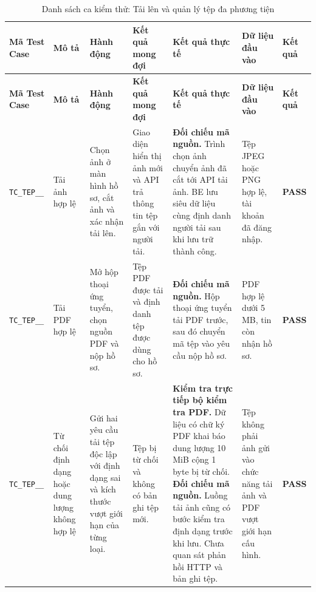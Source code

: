 \begin{landscape}
{
\fontsize{9.5}{11.5}\selectfont
\setlength{\tabcolsep}{3pt}
\renewcommand{\arraystretch}{1.2}
\begin{longtable}{|>{\raggedright\arraybackslash}p{2.1cm}|>{\raggedright\arraybackslash}p{2.8cm}|>{\raggedright\arraybackslash}p{3.8cm}|>{\raggedright\arraybackslash}p{4.0cm}|>{\raggedright\arraybackslash}p{5.0cm}|>{\raggedright\arraybackslash}p{3.2cm}|>{\centering\arraybackslash}p{1.3cm}|}
    \caption{Danh sách ca kiểm thử: Tải lên và quản lý tệp đa phương tiện} \label{tab:ts-tep-01} \\
    \hline
    \textbf{Mã Test Case} & \textbf{Mô tả} & \textbf{Hành động} & \textbf{Kết quả mong đợi} & \textbf{Kết quả thực tế} & \textbf{Dữ liệu đầu vào} & \textbf{Kết quả} \\
    \hline
    \endfirsthead
    \hline
    \textbf{Mã Test Case} & \textbf{Mô tả} & \textbf{Hành động} & \textbf{Kết quả mong đợi} & \textbf{Kết quả thực tế} & \textbf{Dữ liệu đầu vào} & \textbf{Kết quả} \\
    \hline
    \endhead
    \hline
    \endfoot
    \hline
    \endlastfoot
    \texttt{TC\_\allowbreak TEP\_\allowbreak 01\_\allowbreak 01} & Tải ảnh hợp lệ & Chọn ảnh ở màn hình hồ sơ, cắt ảnh và xác nhận tải lên. & Giao diện hiển thị ảnh mới và API trả thông tin tệp gắn với người tải. & \textbf{Đối chiếu mã nguồn.} Trình chọn ảnh chuyển ảnh đã cắt tới API tải ảnh. BE lưu siêu dữ liệu cùng định danh người tải sau khi lưu trữ thành công. & Tệp JPEG hoặc PNG hợp lệ, tài khoản đã đăng nhập. & \textbf{PASS} \\
    \hline
    \texttt{TC\_\allowbreak TEP\_\allowbreak 01\_\allowbreak 02} & Tải PDF hợp lệ & Mở hộp thoại ứng tuyển, chọn nguồn PDF và nộp hồ sơ. & Tệp PDF được tải và định danh tệp được dùng cho hồ sơ. & \textbf{Đối chiếu mã nguồn.} Hộp thoại ứng tuyển tải PDF trước, sau đó chuyển mã tệp vào yêu cầu nộp hồ sơ. & PDF hợp lệ dưới 5 MB, tin còn nhận hồ sơ. & \textbf{PASS} \\
    \hline
    \texttt{TC\_\allowbreak TEP\_\allowbreak 01\_\allowbreak 03} & Từ chối định dạng hoặc dung lượng không hợp lệ & Gửi hai yêu cầu tải tệp độc lập với định dạng sai và kích thước vượt giới hạn của từng loại. & Tệp bị từ chối và không có bản ghi tệp mới. & \textbf{Kiểm tra trực tiếp bộ kiểm tra PDF.} Dữ liệu có chữ ký PDF khai báo dung lượng 10 MiB cộng 1 byte bị từ chối. \textbf{Đối chiếu mã nguồn.} Luồng tải ảnh cũng có bước kiểm tra định dạng trước khi lưu. Chưa quan sát phản hồi HTTP và bản ghi tệp. & Tệp không phải ảnh gửi vào chức năng tải ảnh và PDF vượt giới hạn cấu hình. & \textbf{PASS} \\

\end{longtable}}
\end{landscape}

